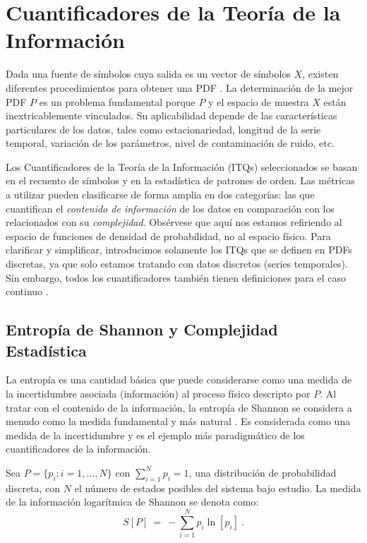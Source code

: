 \section{Cuantificadores de la Teoría de la Información}
\label{sec:ITQs}

Dada una fuente de símbolos cuya salida es un vector de símbolos $X$, existen diferentes procedimientos para obtener una PDF \cite{Rosso2009, DeMicco2008, Mischaikow1999, Powell1979, Rosso2001, Bandt2002}.
La determinación de la mejor PDF $P$ es un problema fundamental porque $P$ y el espacio de muestra $X$ están inextricablemente vinculados.
Su aplicabilidad depende de las características particulares de los datos, tales como estacionariedad, longitud de la serie temporal, variación de los parámetros, nivel de contaminación de ruido, etc.

Los Cuantificadores de la Teoría de la Información (ITQs) seleccionados se basan en el recuento de símbolos y en la estadística de patrones de orden.
Las métricas a utilizar pueden clasificarse de forma amplia en dos categorías: las que cuantifican el \textit{contenido de información} de los datos en comparación con los relacionados con su \textit{complejidad}.
Obsérvese que aquí nos estamos refiriendo al espacio de funciones de densidad de probabilidad, no al espacio físico.
Para clarificar y simplificar, introducimos solamente los ITQs que se definen en PDFs discretas, ya que solo estamos tratando con datos discretos (series temporales).
Sin embargo, todos los cuantificadores también tienen definiciones para el caso continuo \cite{Shannon1948}.

\subsection{Entropía de Shannon y Complejidad Estadística}

La entropía es una cantidad básica que puede considerarse como una medida de la incertidumbre asociada (información) al proceso físico descripto por $P$.
Al tratar con el contenido de la información, la entropía de Shannon se considera a menudo como la medida fundamental y más natural \cite{Shannon1948}.
Es considerada como una medida de la incertidumbre y es el ejemplo más paradigmático de los cuantificadores de la información.

Sea $P=\{p_i; i=1,\ldots, N\}$ con $\sum_{i=1}^N p_i = 1$, una distribución de probabilidad discreta, con $N$ el número de estados posibles del sistema bajo estudio.
La medida de la información logarítmica de Shannon se denota como:
\begin{equation}
\label{Shannon-disc}
S[P] ~=~ -\sum_{i=1}^{N} p_i \ln \left[ p_i \right] \ .
\end{equation}

